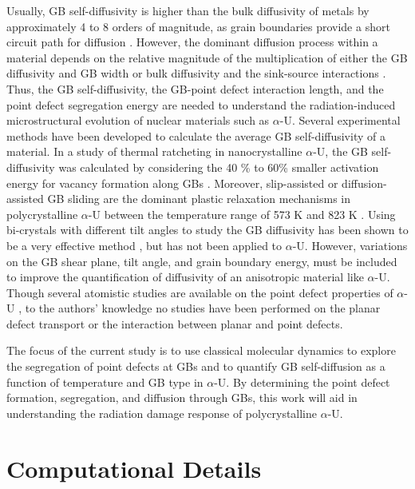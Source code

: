 \documentclass[review]{elsarticle}
\begin{document}
Usually, GB self-diffusivity is higher than the bulk diffusivity of metals by approximately 4 to 8 orders of magnitude, as grain boundaries provide a short circuit path for diffusion \cite{Herzig2005}. However, the dominant diffusion process within a material depends on the relative magnitude of the multiplication of either the GB diffusivity and GB width or bulk diffusivity and the sink-source interactions \cite{Hirth1972}. Thus, the GB self-diffusivity, the GB-point defect interaction length, and the point defect segregation energy are needed to understand the radiation-induced microstructural evolution of nuclear materials such as $\alpha$-U. Several experimental methods have been developed to calculate the average GB self-diffusivity of a material.  In a study of thermal ratcheting in nanocrystalline $\alpha$-U, the GB self-diffusivity was calculated by considering the 40 \% to 60\% smaller activation energy for vacancy formation along GBs \cite{calhoun}. Moreover, slip-assisted or diffusion-assisted GB sliding are the dominant plastic relaxation mechanisms in polycrystalline $\alpha$-U between the temperature range of 573 K and 823 K \cite{calhoun}. Using bi-crystals with different tilt angles to study the GB diffusivity has been shown to be a very effective method \cite{Marquardt:2011:10.1007/s00410-011-0622-7}, but has not been applied to $\alpha$-U. However, variations on the GB shear plane, tilt angle, and grain boundary energy, must be included to improve the quantification of diffusivity of an anisotropic material like $\alpha$-U. Though several atomistic studies are available on the point defect properties of $\alpha$-U \cite{WANG2023154289, beeler_mahbuba_wang_jokisaari_2021,STARIKOV2018451}, to the authors' knowledge no studies have been performed on the planar defect transport or the interaction between planar and point defects. 

The focus of the current study is to use classical molecular dynamics to explore the segregation of point defects at GBs and to quantify GB self-diffusion as a function of temperature and GB type in $\alpha$-U. By determining the point defect formation, segregation, and diffusion through GBs, this work will aid in understanding the radiation damage response of polycrystalline $\alpha$-U. 

\section{Computational Details}\label{sec:comp}
\end{document}
